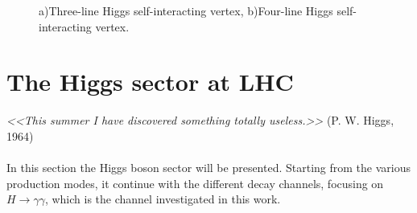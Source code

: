 \begin{figure}[h]
\centering
{} \hspace{0.8cm}
\caption{a)Three-line Higgs self-interacting vertex, b)Four-line Higgs self-interacting vertex.}
\label{self_H}
\end{figure}

\section{The Higgs sector at LHC}
\emph{<<This summer I have discovered something totally useless.>>} (P. W. Higgs, 1964)
\\ \\
In this section the Higgs boson sector will be presented. Starting from the various production modes, it continue with the different decay channels, focusing on $H \rightarrow \gamma \gamma$, which is the channel investigated in this work.
